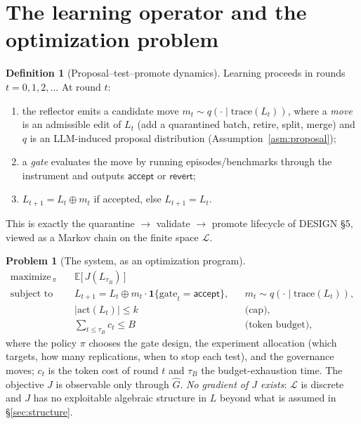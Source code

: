 \documentclass[11pt]{article}
\theoremstyle{plain}
\theoremstyle{definition}
\newtheorem{definition}[theorem]{Definition}
\newtheorem{problem}[theorem]{Problem}
\theoremstyle{remark}
\newcommand{\E}{\mathbb{E}}
\newcommand{\one}{\mathbf{1}}
\newcommand{\cL}{\mathcal{L}}
\begin{document}
\section{The learning operator and the optimization problem}\label{sec:problem}

\begin{definition}[Proposal--test--promote dynamics]\label{def:loop}
Learning proceeds in rounds $t = 0, 1, 2, \dots$ At round $t$:
\begin{enumerate}[label=(\roman*),leftmargin=2.5em]
  \item the reflector emits a candidate move
        $m_t \sim q(\cdot \mid \mathrm{trace}(L_t))$, where a \emph{move} is
        an admissible edit of $L_t$ (add a quarantined batch, retire, split,
        merge) and $q$ is an LLM-induced proposal distribution
        (Assumption~\ref{asm:proposal});
  \item a \emph{gate} evaluates the move by running episodes/benchmarks
        through the instrument and outputs $\textsf{accept}$ or
        $\textsf{revert}$;
  \item $L_{t+1} = L_t \oplus m_t$ if accepted, else $L_{t+1} = L_t$.
\end{enumerate}
This is exactly the quarantine $\to$ validate $\to$ promote lifecycle of
DESIGN \S5, viewed as a Markov chain on the finite space $\cL$.
\end{definition}

\begin{problem}[The system, as an optimization program]\label{prob:main}
\[
\begin{aligned}
  \text{maximize}_{\,\pi}\quad
    & \E\bigl[\,J(L_{\tau_B})\,\bigr] \\
  \text{subject to}\quad
    & L_{t+1} = L_t \oplus m_t \cdot \one\{\text{gate}_t = \textsf{accept}\},
      && m_t \sim q(\cdot \mid \mathrm{trace}(L_t)),\\
    & |\mathrm{act}(L_t)| \le k && \text{(cap)},\\
    & \textstyle\sum_{t \le \tau_B} c_t \le B && \text{(token budget)},
\end{aligned}
\]
where the policy $\pi$ chooses the gate design, the experiment allocation
(which targets, how many replications, when to stop each test), and the
governance moves; $c_t$ is the token cost of round $t$ and $\tau_B$ the
budget-exhaustion time. The objective $J$ is observable only through
$\widehat G$. \emph{No gradient of $J$ exists}: $\cL$ is discrete and $J$ has
no exploitable algebraic structure in $L$ beyond what is assumed in
\S\ref{sec:structure}.
\end{problem}
\end{document}
